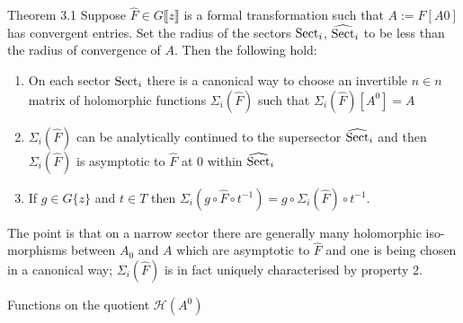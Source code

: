 \begin{frame}{Theorem 3.1}
  Suppose $\hat{F}\in G\llbracket z\rrbracket$ is a formal transformation such
  that $A:=F[A0]$ has convergent entries. Set the radius of the sectors
  $\operatorname{Sect}_i$, $\widehat{\operatorname{Sect}}_i$ to be less than the radius of convergence of
  $A$.
  Then the following hold:
  \begin{enumerate}
    \item On each sector $\operatorname{Sect}_i$ there is a canonical way to choose an
      invertible $n\in n$ matrix of holomorphic functions $\Sigma_i(\hat F)$
      such that $\Sigma_i(\hat F)[A^0]=A$
    \item $\Sigma_i(\hat F)$ can be analytically continued to the supersector
      $\widehat{\operatorname{Sect}}_i$ and then $\Sigma_i(\hat F)$ is asymptotic to $\hat F$
      at $0$ within $\widehat{\operatorname{Sect}}_i$
    \item If $g\in G\{z\}$ and $t\in T$ then
      $\Sigma_i(g\circ\hat F \circ t^{-1})=g\circ\Sigma_i(\hat F)\circ t^{-1}$.
  \end{enumerate}
  The point is that on a narrow sector there are generally many holomorphic
  iso-morphisms between $A_0$ and $A$ which are asymptotic to $\hat F$ and one
  is being chosen in a canonical way; $\Sigma_i(\hat F)$ is in fact uniquely
  characterised by property 2.
\end{frame}

\begin{frame}{Functions on the quotient $\mathcal{H}(A^0)$}

\end{frame}

\begin{frame}
\end{frame}
